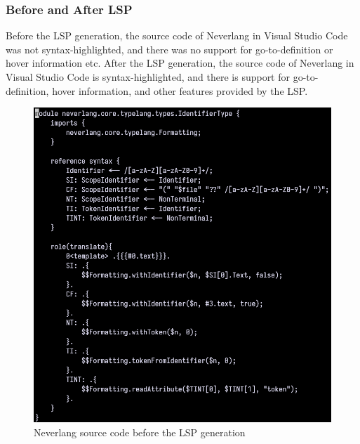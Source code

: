 \subsubsection{Before and After LSP}\label{sec:neverlang-before-after-lsp}

Before the LSP generation, the source code of Neverlang in Visual Studio Code was not syntax-highlighted, and there was no support for go-to-definition or hover information etc. After the LSP generation, the source code of Neverlang in Visual Studio Code is syntax-highlighted, and there is support for go-to-definition, hover information, and other features provided by the LSP.

\begin{figure}[h!]
    \centering
    \begin{minipage}{0.45\textwidth}
        \centering
        \includegraphics[width=\linewidth]{./imgs/neverlang-lsp-before-vim.png}
        \caption{Neverlang source code before the LSP generation}
    \end{minipage}\hfill
    \begin{minipage}{0.45\textwidth}
        \centering

\end{minipage}
\end{figure}
